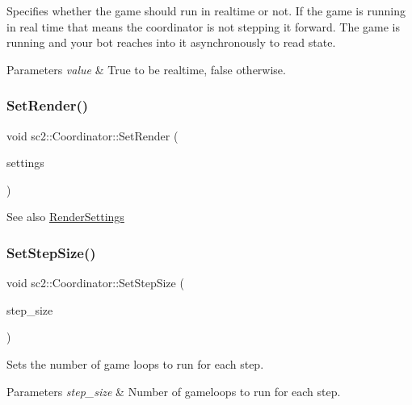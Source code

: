 Specifies whether the game should run in realtime or not. If the game is running in real time that means the coordinator is not stepping it forward. The game is running and your bot reaches into it asynchronously to read state. 
\begin{DoxyParams}{Parameters}
{\em value} & True to be realtime, false otherwise. \\
\hline
\end{DoxyParams}
\mbox{\label{classsc2_1_1_coordinator_ace8a0630c6b61d28e81c94bbebad3d7d}} 
\subsubsection{\texorpdfstring{Set\+Render()}{SetRender()}}
{\footnotesize\ttfamily void sc2\+::\+Coordinator\+::\+Set\+Render (\begin{DoxyParamCaption}\item[{const \hyperlink{structsc2_1_1_render_settings}{Render\+Settings} \&}]{settings }\end{DoxyParamCaption})}

\begin{DoxySeeAlso}{See also}
\hyperlink{structsc2_1_1_render_settings}{Render\+Settings} 
\end{DoxySeeAlso}
\mbox{\label{classsc2_1_1_coordinator_a7cea718f571effbe25b771315628c685}} 
\subsubsection{\texorpdfstring{Set\+Step\+Size()}{SetStepSize()}}
{\footnotesize\ttfamily void sc2\+::\+Coordinator\+::\+Set\+Step\+Size (\begin{DoxyParamCaption}\item[{int}]{step\+\_\+size }\end{DoxyParamCaption})}

Sets the number of game loops to run for each step. 
\begin{DoxyParams}{Parameters}
{\em step\+\_\+size} & Number of gameloops to run for each step. \\
\hline
\end{DoxyParams}
\mbox{\label{classsc2_1_1_coordinator_aadbfd927d66314a4eb949b2de2ae37b4}} 
